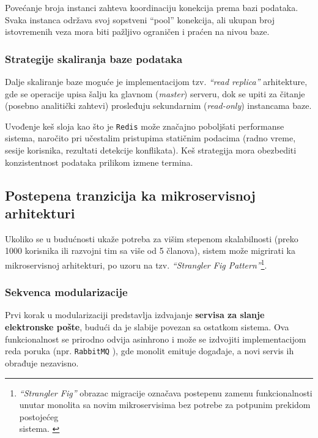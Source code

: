 \documentclass[12pt]{article}
\begin{document}
    Povećanje broja instanci zahteva koordinaciju konekcija prema bazi podataka. Svaka instanca održava svoj sopstveni ``pool'' konekcija, ali ukupan broj istovremenih veza mora biti pažljivo ograničen i praćen na nivou baze.

    \subsubsection*{Strategije skaliranja baze podataka}

    Dalje skaliranje baze moguće je implementacijom tzv. \textit{``read replica''} arhitekture, gde se operacije upisa šalju ka glavnom (\textit{master}) serveru, dok se upiti za čitanje (posebno analitički zahtevi) prosleđuju sekundarnim (\textit{read-only}) instancama baze.

    Uvođenje keš sloja kao što je \texttt{Redis} \cite{redis} može značajno poboljšati performanse sistema, naročito pri učestalim pristupima statičnim podacima (radno vreme, sesije korisnika, rezultati detekcije konflikata). Keš strategija mora obezbediti konzistentnost podataka prilikom izmene termina.

    \subsection{Postepena tranzicija ka mikroservisnoj arhitekturi}

    Ukoliko se u budućnosti ukaže potreba za višim stepenom skalabilnosti 
    (preko 1000 korisnika ili razvojni tim sa više od 5 članova), sistem može migrirati ka 
    mikroservisnoj arhitekturi, po uzoru na tzv. \textit{``Strangler Fig Pattern''}\footnote{\textit{``Strangler Fig''} obrazac migracije označava postepenu 
    zamenu funkcionalnosti unutar monolita sa novim mikroservisima bez potrebe za potpunim prekidom 
    postojećeg \\ sistema. \cite{fowler2004strangler}}.


    \subsubsection*{Sekvenca modularizacije}

    Prvi korak u modularizaciji predstavlja izdvajanje \textbf{servisa za slanje elektronske pošte}, budući da je slabije povezan sa ostatkom sistema. Ova funkcionalnost se prirodno odvija asinhrono i može se izdvojiti implementacijom reda 
    poruka (npr. \texttt{RabbitMQ} \cite{rabbitmq}), gde monolit emituje događaje, a novi servis ih obrađuje nezavisno.
\end{document}
